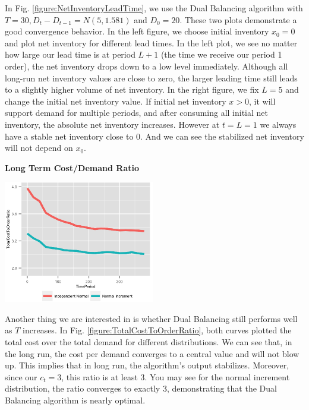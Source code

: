 \documentclass[twoside]{article}
\begin{document}
\begin{multicols}{2}
In Fig. \ref{figure:NetInventoryLeadTime}, we use the Dual Balancing algorithm with $T=30,D_t-D_{t-1} = N(5,1.581)$ and $D_0=20$. These two plots demonstrate a good convergence behavior. In the left figure, we choose initial inventory $x_0 = 0$ and plot net inventory for different lead times. In the left plot, we see no matter how large our lead time is at period $L+1$ (the time we receive our period 1 order), the net inventory drops down to a low level immediately. Although all long-run net inventory values are close to zero, the larger leading time still leads to a slightly higher volume of net inventory. In the right figure, we fix $L = 5$ and change the initial net inventory value. If initial net inventory $x > 0$, it will support demand for multiple periods, and after consuming all initial net inventory, the absolute net inventory increases. However at $t=L=1$ we always have a stable net inventory close to 0. And we can see the stabilized net inventory will not depend on $x_0$.\\
\newpage
\begin{center}
  \textbf{Long Term Cost/Demand Ratio}
\end{center}
\begin{center}
  \label{figure:TotalCostToOrderRatio}
  \includegraphics[width=2.6in]{figures/TotalCostToOrderRatio.png}
\end{center}
Another thing we are interested in is whether Dual Balancing still performs well as $T$ increases. In Fig. \ref{figure:TotalCostToOrderRatio}, both curves plotted the total cost over the total demand for different distributions. We can see that, in the long run, the cost per demand converges to a central value and will not blow up. This implies that in long run, the algorithm's output stabilizes. Moreover, since our $c_t=3$, this ratio is at least $3$. You may see for the normal increment distribution, the ratio converges to exactly $3$, demonstrating that the Dual Balancing algorithm is nearly optimal.

\end{multicols}
\end{document}
